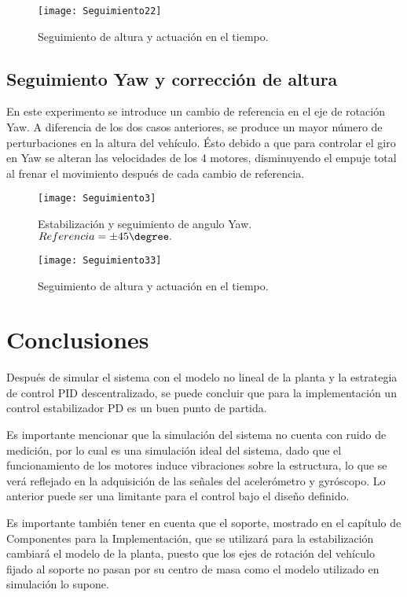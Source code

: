 \documentclass[../main.tex]{subfiles}
\begin{document}
\begin{figure}[H]
\noindent \begin{centering}
\texttt{[image: Seguimiento22]}
\par\end{centering}
\caption{Seguimiento de altura y actuación en el tiempo.}
\end{figure}

\subsection{Seguimiento Yaw y corrección de altura}

En este experimento se introduce un cambio de referencia en el eje
de rotación Yaw. A diferencia de los dos casos anteriores, se produce
un mayor número de perturbaciones en la altura del vehículo. Ésto
debido a que para controlar el giro en Yaw se alteran las velocidades
de los 4 motores, disminuyendo el empuje total al frenar el movimiento
después de cada cambio de referencia.

\begin{figure}[H]
\noindent \begin{centering}
\texttt{[image: Seguimiento3]}
\par\end{centering}
\caption{Estabilización y seguimiento de angulo Yaw. $Referencia=\pm45\degree.$}
\end{figure}

\begin{figure}[H]
\noindent \begin{centering}
\texttt{[image: Seguimiento33]}
\par\end{centering}
\caption{Seguimiento de altura y actuación en el tiempo.}
\end{figure}

\section{Conclusiones}

Después de simular el sistema con el modelo no lineal de la planta y la
estrategia de control PID descentralizado, se puede concluir que
para la implementación un control estabilizador PD es un buen punto
de partida.

Es importante mencionar que la simulación del sistema no cuenta con
ruido de medición, por lo cual es una simulación ideal del sistema,
dado que el funcionamiento de los motores induce vibraciones sobre
la estructura, lo que se verá reflejado en la adquisición de las señales
del acelerómetro y gyróscopo. Lo anterior puede ser una limitante
para el control bajo el diseño definido.

Es importante también tener en cuenta que el soporte, mostrado en el capítulo de Componentes para la Implementación, que se utilizará
para la estabilización cambiará el modelo de la planta, puesto que
los ejes de rotación del vehículo fijado al soporte no pasan por su
centro de masa como el modelo utilizado en simulación lo supone.
\end{document}

